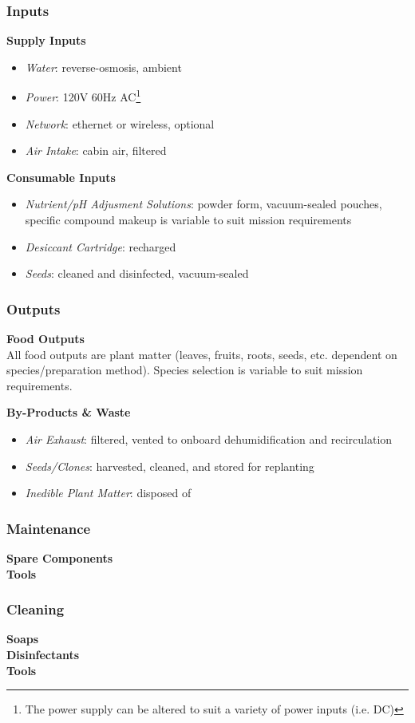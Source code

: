 \clearpage

\subsubsection{Inputs}

\textbf{Supply Inputs}
\begin{itemize}
    \item \textit{Water}: reverse-osmosis, ambient
    \item \textit{Power}: 120V 60Hz AC\footnote{The power supply can be altered to suit a variety of power inputs (i.e. DC)}
    \item \textit{Network}: ethernet or wireless, optional
    \item \textit{Air Intake}: cabin air, filtered
\end{itemize}

\textbf{Consumable Inputs}
\begin{itemize}
    \item \textit{Nutrient/pH Adjusment Solutions}: powder form, vacuum-sealed pouches, specific compound makeup is variable to suit mission requirements
    \item \textit{Desiccant Cartridge}: recharged
    \item \textit{Seeds}: cleaned and disinfected, vacuum-sealed
\end{itemize}

\subsubsection{Outputs}

\textbf{Food Outputs}\\
All food outputs are plant matter (leaves, fruits, roots, seeds, etc. dependent on species/preparation method). Species selection is variable to suit mission requirements.

\textbf{By-Products \& Waste}
\begin{itemize}
    \item \textit{Air Exhaust}: filtered, vented to onboard dehumidification and recirculation
    \item \textit{Seeds/Clones}: harvested, cleaned, and stored for replanting
    \item \textit{Inedible Plant Matter}: disposed of
\end{itemize}

\subsubsection{Maintenance}

\textbf{Spare Components}\\


\textbf{Tools}\\


\subsubsection{Cleaning}

\textbf{Soaps}\\


\textbf{Disinfectants}\\


\textbf{Tools}\\

